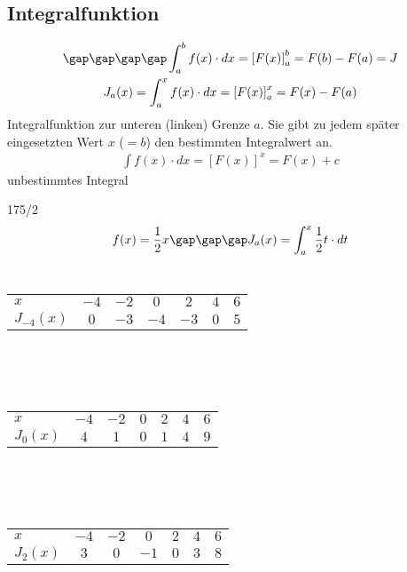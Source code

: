\subsection{Integralfunktion}
\begin{gather*}
  \gap\gap\gap\gap \int_a^b f(x) \cdot dx = \left[F(x)\right]_a^b = F(b) - F(a) = J \\
  J_a(x) = \int_a^x f(x) \cdot dx = \left[F(x)\right]_a^x = F(x) - F(a)
\end{gather*}
Integralfunktion zur unteren (linken) Grenze $a$. Sie gibt zu jedem später eingesetzten Wert $x$ ($= b$) den bestimmten Integralwert an.
\begin{gather*}
  \int f(x) \cdot dx = \left[F(x)\right]^x = F(x) + c
\end{gather*}
unbestimmtes Integral
\begin{exercise}{175/2}
  \begin{gather*}
    f(x) = \frac{1}{2}x \gap\gap\gap J_a(x) = \int_a^x \frac{1}{2}t \cdot dt
  \end{gather*} \\
  \begin{tabular}{l|cccccc}
    $x$ & $-4$ & $-2$ & $0$ & $2$ & $4$ & $6$ \\
    $J_{-4}(x)$ & $0$ & $-3$ & $-4$ & $-3$ & $0$ & $5$
  \end{tabular} \\\\\\
  \begin{tabular}{l|cccccc}
    $x$ & $-4$ & $-2$ & $0$ & $2$ & $4$ & $6$ \\
    $J_0(x)$ & $4$ & $1$ & $0$ & $1$ & $4$ & $9$
  \end{tabular} \\\\\\
  \begin{tabular}{l|cccccc}
    $x$ & $-4$ & $-2$ & $0$ & $2$ & $4$ & $6$ \\
    $J_2(x)$ & $3$ & $0$ & $-1$ & $0$ & $3$ & $8$
  \end{tabular}
\end{exercise}
